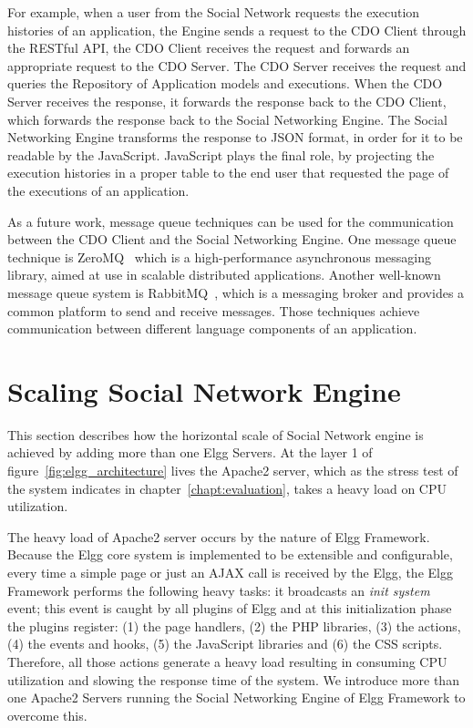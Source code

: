 For example, when a user from the Social Network requests the execution histories of an application, the Engine sends a request to the CDO Client through the RESTful API, the CDO Client receives the request and forwards an appropriate request to the CDO Server. The CDO Server receives the request and queries the Repository of Application models and executions. When the CDO Server receives the response, it forwards the response back to the CDO Client, which forwards the response back to the Social Networking Engine. The Social Networking Engine transforms the response to JSON format, in order for it to be readable by the JavaScript. JavaScript plays the final role, by projecting the execution histories in a proper table to the end user that requested the page of the executions of an application.

As a future work, message queue techniques can be used for the communication between the CDO Client and the Social Networking Engine. One message queue technique is ZeroMQ~\cite{zeromq_url} which is a high-performance asynchronous messaging library, aimed at use in scalable distributed applications. Another well-known message queue system is RabbitMQ~\cite{rabbitmq_url}, which is a messaging broker and provides a common platform to send and receive messages. Those techniques achieve communication between different language components of an application.

\section{Scaling Social Network Engine}
\label{sec:engine_scale}
This section describes how the horizontal scale of Social Network engine is achieved by adding more than one Elgg Servers. At the layer 1 of figure~\ref{fig:elgg_architecture} lives the Apache2 server, which as the stress test of the system indicates in chapter~\ref{chapt:evaluation}, takes a heavy load on CPU utilization. 

The heavy load of Apache2 server occurs by the nature of Elgg Framework. Because the Elgg core system is implemented to be extensible and configurable, every time a simple page or just an AJAX call is received by the Elgg, the Elgg Framework performs the following heavy tasks: it broadcasts an {\it init system} event; this event is caught by all plugins of Elgg and at this initialization phase the plugins register: (1) the page handlers, (2) the PHP libraries, (3) the actions, (4) the events and hooks, (5) the JavaScript libraries and (6) the CSS scripts. Therefore, all those actions generate a heavy load resulting in consuming CPU utilization and slowing the response time of the system. We introduce more than one Apache2 Servers running the Social Networking Engine of Elgg Framework to overcome this.  

